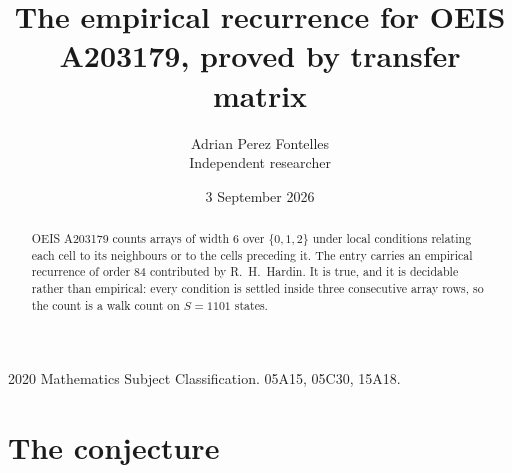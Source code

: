 \documentclass[11pt,a4paper]{article}
\title{The empirical recurrence for OEIS A203179, proved by transfer matrix}
\author{Adrian Perez Fontelles\\ \small Independent researcher}
\date{3 September 2026}
\theoremstyle{plain}
\theoremstyle{definition}
\begin{document}
\maketitle

\begin{abstract}
OEIS A203179 counts arrays of width $6$ over $\{0,1,2\}$ under local conditions relating each cell
to its neighbours or to the cells preceding it. The entry carries an empirical recurrence of
order $84$ contributed by R.~H.~Hardin. It is true, and it is decidable rather than
empirical: every condition is settled inside three consecutive array rows, so the count is a
walk count on $S=1101$ states.
\end{abstract}

\noindent\small 2020 Mathematics Subject Classification. 05A15, 05C30, 15A18.\normalsize

\section{The conjecture}
\end{document}
